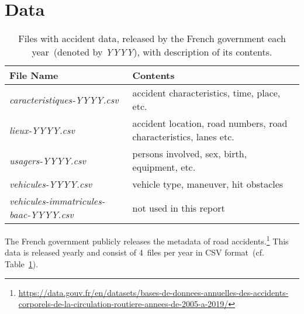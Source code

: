 \section{Data}
\label{data}
\begin{table}
    \caption{Files with accident data, released by the French government each year~(denoted by \textit{YYYY}), with description of its contents.}
    \label{table-files}
    \begin{tabularx}{\linewidth}{lX}
        \toprule
        \textbf{File Name} & \textbf{Contents} \\
        \midrule
        \textit{caracteristiques-YYYY.csv} & accident characteristics, time, place, etc. \\
        \textit{lieux-YYYY.csv} & accident location, road numbers, road characteristics, lanes etc. \\
        \textit{usagers-YYYY.csv} & persons involved, sex, birth, equipment, etc. \\
        \textit{vehicules-YYYY.csv} & vehicle type, maneuver, hit obstacles \\
        \textit{vehicules-immatricules-baac-YYYY.csv} & not used in this report \\
        \bottomrule
    \end{tabularx}
\end{table}
The French government publicly releases the metadata of road accidents.\footnote{\url{https://data.gouv.fr/en/datasets/bases-de-donnees-annuelles-des-accidents-corporels-de-la-circulation-routiere-annees-de-2005-a-2019/}}
This data is released yearly and consist of 4~files per year in CSV format~(cf. Table~\ref{table-files}).



